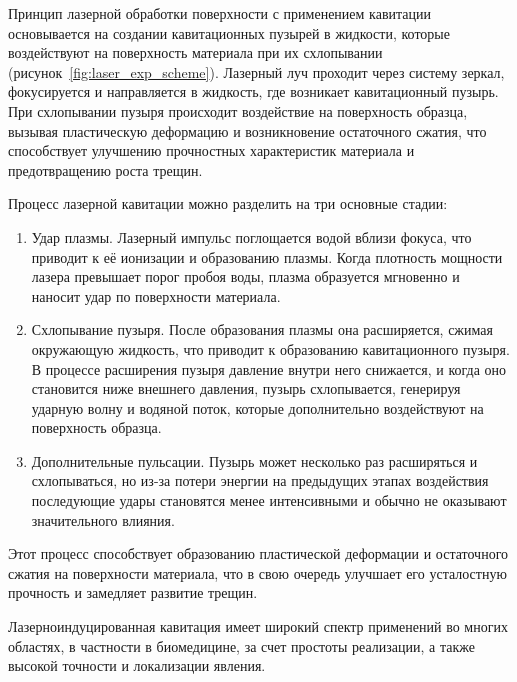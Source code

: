 Принцип лазерной обработки поверхности с применением кавитации основывается на создании кавитационных пузырей в жидкости, которые воздействуют на поверхность материала при их схлопывании (рисунок~\ref{fig:laser_exp_scheme}).
Лазерный луч проходит через систему зеркал, фокусируется и направляется в жидкость, где возникает кавитационный пузырь. При схлопывании пузыря происходит воздействие на поверхность образца, вызывая пластическую деформацию и возникновение остаточного сжатия, что способствует улучшению прочностных характеристик материала и предотвращению роста трещин.

Процесс лазерной кавитации можно разделить на три основные стадии:
\begin{enumerate}
    \item Удар плазмы. Лазерный импульс поглощается водой вблизи фокуса, что приводит к её ионизации и образованию плазмы. Когда плотность мощности лазера превышает порог пробоя воды, плазма образуется мгновенно и наносит удар по поверхности материала.
    \item Схлопывание пузыря. После образования плазмы она расширяется, сжимая окружающую жидкость, что приводит к образованию кавитационного пузыря. В процессе расширения пузыря давление внутри него снижается, и когда оно становится ниже внешнего давления, пузырь схлопывается, генерируя ударную волну и водяной поток, которые дополнительно воздействуют на поверхность образца.
    \item Дополнительные пульсации. Пузырь может несколько раз расширяться и схлопываться, но из-за потери энергии на предыдущих этапах воздействия последующие удары становятся менее интенсивными и обычно не оказывают значительного влияния.
\end{enumerate}
Этот процесс способствует образованию пластической деформации и остаточного сжатия на поверхности материала, что в свою очередь улучшает его усталостную прочность и замедляет развитие трещин.~\cite{10.1016/j.optlastec.2023.110212}

Лазерноиндуцированная кавитация имеет широкий спектр применений во многих областях, в частности в биомедицине, за счет простоты реализации, а также высокой точности и локализации явления.

